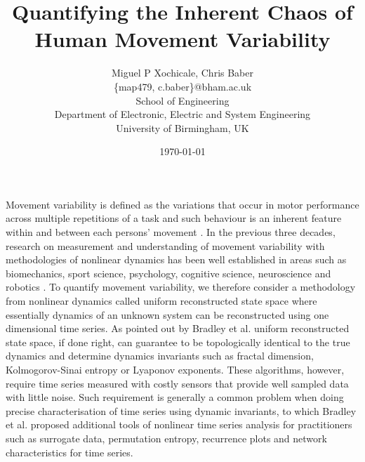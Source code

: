 \documentclass[10pt]{article}
\author{Miguel P Xochicale, Chris Baber \\
\{map479, c.baber\}@bham.ac.uk \\
School of Engineering\\
Department of Electronic, Electric and System Engineering\\
University of Birmingham, UK}
\title{Quantifying the Inherent Chaos of \\ Human Movement Variability}
\date{\today}
\begin{document}
\maketitle


Movement variability is defined as the variations that occur in motor
performance across multiple repetitions of a task and such behaviour is an
inherent feature within and between each persons' movement \cite{tlockhart2013}.
In the previous three decades, research on measurement and understanding of
movement variability with methodologies of nonlinear dynamics has been well established
in areas such as biomechanics, sport science, psychology, cognitive science,
neuroscience and robotics \cite{stergiou2011,harbourne2009}.
To quantify movement variability, we therefore consider a methodology from nonlinear dynamics
called uniform reconstructed state space where essentially dynamics of
an unknown system can be reconstructed using one dimensional time series.
As pointed out by Bradley et al. \cite{bradley2015} uniform reconstructed state space,
if done right, can guarantee to be topologically identical to the true dynamics
and determine dynamics invariants such as fractal dimension, Kolmogorov-Sinai
entropy or Lyaponov exponents.
These algorithms, however, require time series measured with costly sensors
that provide well sampled data with little noise.
Such requirement is generally a common problem when doing precise
characterisation of time series using dynamic invariants,
to which Bradley et al. \cite{bradley2015} proposed additional tools of
nonlinear time series analysis for practitioners such as surrogate data,
permutation entropy, recurrence plots and network characteristics for time series.
\end{document}
